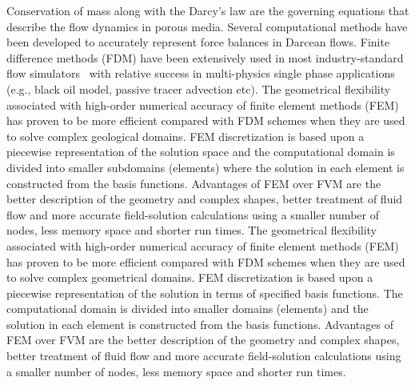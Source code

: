 \documentclass[preprint,authoryear,12pt]{elsarticle}
\begin{document}
\medskip 
Conservation of mass along with the Darcy's law are the governing equations that describe the flow dynamics in porous media. Several computational methods have been developed to accurately represent force balances in Darcean flows.
Finite difference methods (FDM) have been extensively used in most industry-standard flow simulators~\citep{aziz_1986, chen_2005, chang_1990} with relative success in multi-physics single phase applications (e.g., black oil model, passive tracer advection etc). 
The geometrical flexibility associated with high-order numerical accuracy of finite element methods (FEM) has proven to be more efficient compared with FDM schemes when they are used to solve complex geological domains. FEM discretization is based upon a piecewise representation of the solution space  and the computational domain is divided into smaller subdomains (elements) where the solution in each element is constructed from the basis functions. Advantages of FEM over FVM are the better description of the geometry and complex shapes, better treatment of fluid flow and more accurate field-solution calculations using a smaller number of nodes, less memory space and shorter run times. %
The geometrical flexibility associated with high-order numerical accuracy of finite element methods (FEM) has proven to be more efficient compared with FDM schemes when they are used to solve complex geometrical domains. FEM discretization is based upon a piecewise representation of the solution in terms of specified basis functions. The computational domain is divided into smaller domains (elements) and the solution in each element is constructed from the basis functions. Advantages of FEM over FVM are the better description of the geometry and complex shapes, better treatment of fluid flow and more accurate field-solution calculations using a smaller number of nodes, less memory space and shorter run times. 
\end{document}
